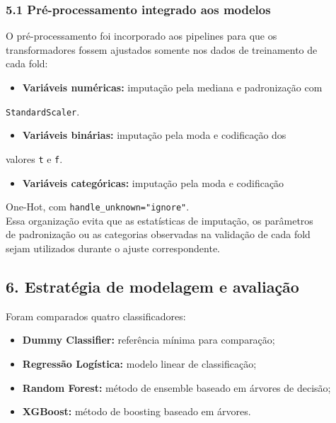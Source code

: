 \documentclass{article}
\begin{document}
\subsubsection{5.1 Pré-processamento integrado aos modelos}

O pré-processamento foi incorporado aos pipelines para que os \\
transformadores fossem ajustados somente nos dados de treinamento de \\
cada fold: \\

\begin{itemize}
  \item   \textbf{Variáveis numéricas:} imputação pela mediana e padronização com
\end{itemize}
\texttt{StandardScaler}. \\
\begin{itemize}
  \item   \textbf{Variáveis binárias:} imputação pela moda e codificação dos
\end{itemize}
valores \texttt{t} e \texttt{f}. \\
\begin{itemize}
  \item   \textbf{Variáveis categóricas:} imputação pela moda e codificação
\end{itemize}
One-Hot, com \texttt{handle\_unknown="ignore"}. \\

Essa organização evita que as estatísticas de imputação, os parâmetros \\
de padronização ou as categorias observadas na validação de cada fold \\
sejam utilizados durante o ajuste correspondente. \\

\subsection{6. Estratégia de modelagem e avaliação}

Foram comparados quatro classificadores: \\

\begin{itemize}
  \item   \textbf{Dummy Classifier:} referência mínima para comparação;
  \item   \textbf{Regressão Logística:} modelo linear de classificação;
  \item   \textbf{Random Forest:} método de ensemble baseado em árvores de decisão;
  \item   \textbf{XGBoost:} método de boosting baseado em árvores.
\end{itemize}
\end{document}
